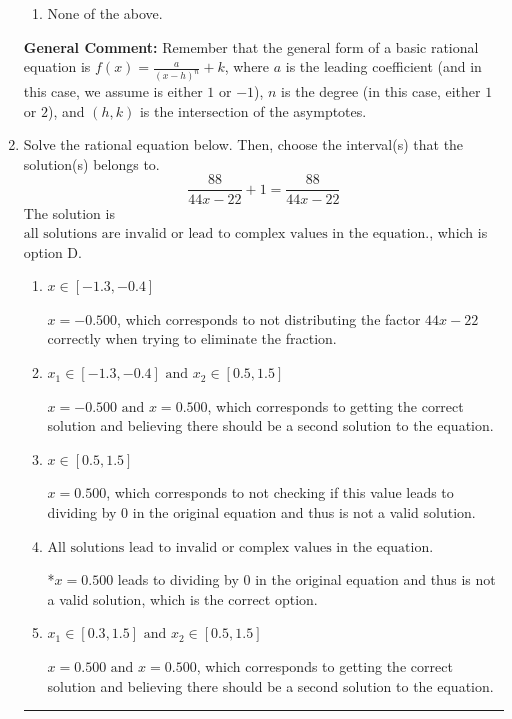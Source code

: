 \documentclass{extbook}[14pt]
\newcommand{\litem}[1]{\item #1

\rule{\textwidth}{0.4pt}}
\begin{document}
\begin{enumerate}
{\begin{enumerate}[label=\Alph*.]
\item None of the above.\end{enumerate}
\textbf{General Comment:} Remember that the general form of a basic rational equation is $ f(x) = \frac{a}{(x-h)^n} + k$, where $a$ is the leading coefficient (and in this case, we assume is either $1$ or $-1$), $n$ is the degree (in this case, either $1$ or $2$), and $(h, k)$ is the intersection of the asymptotes.
}
\litem{
Solve the rational equation below. Then, choose the interval(s) that the solution(s) belongs to.
\[ \frac{88}{44x -22} + 1 = \frac{88}{44x -22} \]The solution is \( \text{all solutions are invalid or lead to complex values in the equation.} \), which is option D.\begin{enumerate}[label=\Alph*.]
\item \( x \in [-1.3,-0.4] \)

$x = -0.500$, which corresponds to not distributing the factor $44x -22$ correctly when trying to eliminate the fraction.
\item \( x_1 \in [-1.3, -0.4] \text{ and } x_2 \in [0.5,1.5] \)

$x = -0.500 \text{ and } x = 0.500$, which corresponds to getting the correct solution and believing there should be a second solution to the equation.
\item \( x \in [0.5,1.5] \)

$x = 0.500$, which corresponds to not checking if this value leads to dividing by 0 in the original equation and thus is not a valid solution.
\item \( \text{All solutions lead to invalid or complex values in the equation.} \)

*$x = 0.500$ leads to dividing by 0 in the original equation and thus is not a valid solution, which is the correct option.
\item \( x_1 \in [0.3, 1.5] \text{ and } x_2 \in [0.5,1.5] \)

$x = 0.500 \text{ and } x = 0.500$, which corresponds to getting the correct solution and believing there should be a second solution to the equation.
\end{enumerate}

}
\end{enumerate}
\end{document}
